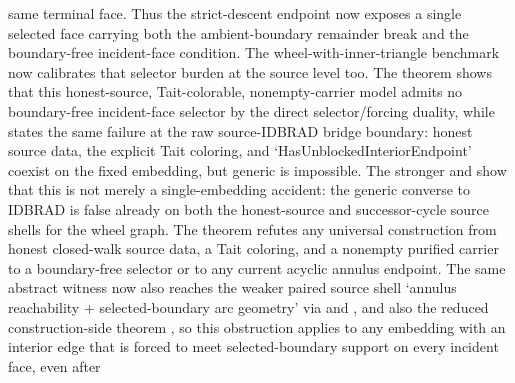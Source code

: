\documentclass[11pt]{article}
\begin{document}
\begin{itemize}
same terminal face.  Thus the strict-descent endpoint now exposes a single
selected face carrying both the ambient-boundary remainder break and the
boundary-free incident-face condition.  The
wheel-with-inner-triangle benchmark now calibrates that selector burden at the
source level too.  The theorem
shows that this honest-source, Tait-colorable, nonempty-carrier model admits no
boundary-free incident-face selector by the direct selector/forcing duality,
while
states the same failure at the raw source-IDBRAD bridge boundary: honest source
data, the explicit Tait coloring, and `HasUnblockedInteriorEndpoint' coexist on
the fixed embedding, but generic
 is impossible.  The stronger
and
show that this is not merely a single-embedding accident: the generic converse
to IDBRAD is false already on both the honest-source and successor-cycle source
shells for the wheel graph.  The theorem
refutes any universal construction from honest closed-walk source data, a Tait
coloring, and a nonempty purified carrier to a boundary-free selector or to any
current acyclic annulus endpoint.
The same abstract witness now also reaches the weaker paired source shell
`annulus reachability + selected-boundary arc geometry' via
and
,
and also the reduced construction-side theorem
,
so this obstruction applies to any embedding with an interior edge that is
forced to meet selected-boundary support on every incident face, even after

\end{itemize}
\end{document}
